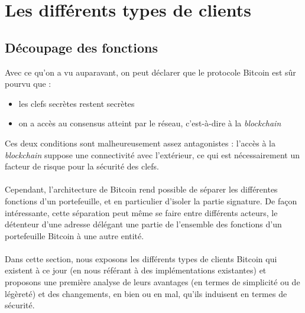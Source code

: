 \documentclass[11pt,a4paper]{article}
\begin{document}
\section{Les différents types de clients}
\subsection{Découpage des fonctions}
Avec ce qu'on a vu auparavant, on peut déclarer que le protocole Bitcoin est sûr pourvu que :\begin{itemize}
	\item les clefs secrètes restent secrètes
	\item on a accès au consensus atteint par le réseau, c'est-à-dire à la \textit{blockchain}
\end{itemize}
Ces deux conditions sont malheureusement assez antagonistes : l'accès à la \textit{blockchain} suppose une connectivité avec l'extérieur, ce qui est nécessairement un facteur de risque pour la sécurité des clefs.\\\\
Cependant, l'architecture de Bitcoin rend possible de séparer les différentes fonctions d'un portefeuille, et en particulier d'isoler la partie signature. De façon intéressante, cette séparation peut même se faire entre différents acteurs, le détenteur d'une adresse délégant une partie de l'ensemble des fonctions d'un portefeuille Bitcoin à une autre entité.\\\\
Dans cette section, nous exposons les différents types de clients Bitcoin qui existent à ce jour (en nous référant à des implémentations existantes) et proposons une première analyse de leurs avantages (en termes de simplicité ou de légèreté) et des changements, en bien ou en mal, qu'ils induisent en termes de sécurité.
\end{document}
